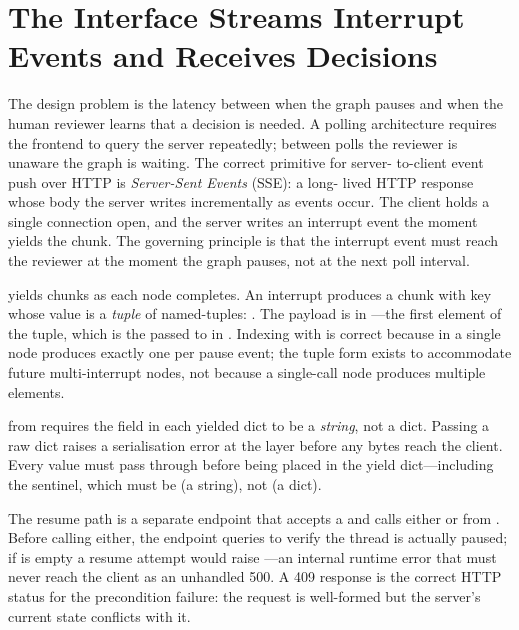 \section{The Interface Streams Interrupt Events and Receives Decisions}
\label{sec:hitl-api}

The design problem is the latency between when the graph pauses and when
the human reviewer learns that a decision is needed. A polling architecture
requires the frontend to query the server repeatedly; between polls the
reviewer is unaware the graph is waiting. The correct primitive for server-
to-client event push over HTTP is \emph{Server-Sent Events} (SSE): a long-
lived HTTP response whose body the server writes incrementally as events
occur. The client holds a single connection open, and the server writes an
interrupt event the moment  yields the
 chunk. The governing principle is that the
interrupt event must reach the reviewer at the moment the graph pauses,
not at the next poll interval.

 yields 
chunks as each node completes. An interrupt produces a chunk with key
 whose value is a \emph{tuple} of 
named-tuples: .
The payload is in ---the first element
of the tuple, which is the  passed to 
in . Indexing with \code{[0]} is correct because
 in a single node produces exactly one 
per pause event; the tuple form exists to accommodate future multi-interrupt
nodes, not because a single-call node produces multiple elements.

\begin{warningbox}
 from  requires the
 field in each yielded dict to be a \emph{string}, not a
dict. Passing a raw dict raises a serialisation error at the
 layer before any bytes reach the client. Every
 value must pass through  before being
placed in the yield dict---including the  sentinel, which
must be  (a string), not \code{\{\}} (a dict).
\end{warningbox}

The resume path is a separate  endpoint that accepts a
 and calls either  or
 from . Before calling either,
the endpoint queries  to verify the
thread is actually paused; if  is empty a resume attempt would
raise ---an internal runtime error that must never
reach the client as an unhandled 500. A 409 response is the correct HTTP
status for the precondition failure: the request is well-formed but the
server's current state conflicts with it.

